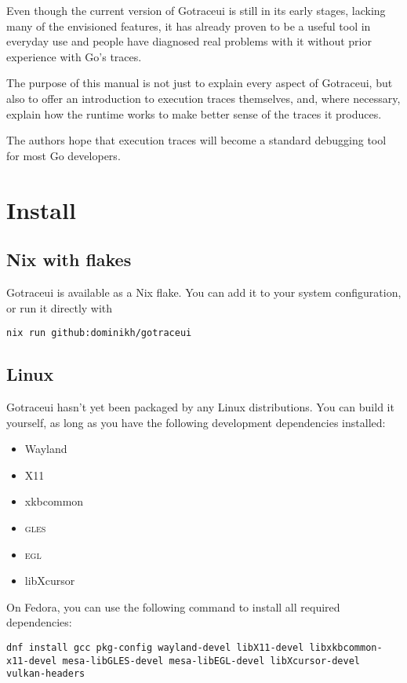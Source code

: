 \documentclass[10pt,letterpaper,oneside,openany,english]{memoir}
\begin{document}
Even though the current version of Gotraceui is still in its early stages,
lacking many of the envisioned features,
it has already proven to be a useful tool in everyday use
and people have diagnosed real problems with it without prior experience with Go's traces.

The purpose of this manual is not just to explain every aspect of Gotraceui,
but also to offer an introduction to execution traces themselves,
and, where necessary, explain how the runtime works to make better sense of the traces it produces.

The authors hope that execution traces will become a standard debugging tool for most Go developers.

\chapter{Install}

\section*{Nix with flakes}

Gotraceui is available as a Nix flake. You can add it to your system configuration, or run it directly with
\begin{verbatim}
nix run github:dominikh/gotraceui
\end{verbatim}

\section*{Linux}

Gotraceui hasn't yet been packaged by any Linux distributions.
You can build it yourself, as long as you have the following development dependencies installed:

\begin{itemize}
\item Wayland
\item X11
\item xkbcommon
\item \textsc{gles}
\item \textsc{egl}
\item libXcursor
\end{itemize}

On Fedora, you can use the following command to install all required dependencies:

\begin{verbatim}
dnf install gcc pkg-config wayland-devel libX11-devel libxkbcommon-x11-devel mesa-libGLES-devel mesa-libEGL-devel libXcursor-devel vulkan-headers
\end{verbatim}
\end{document}
